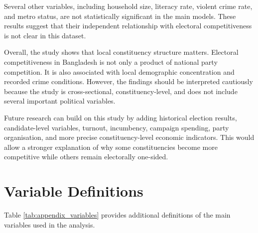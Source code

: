 \documentclass[12pt,a4paper]{article}
\begin{document}
Several other variables, including household size, literacy rate, violent crime rate, and metro status, are not statistically significant in the main models. These results suggest that their independent relationship with electoral competitiveness is not clear in this dataset.

Overall, the study shows that local constituency structure matters. Electoral competitiveness in Bangladesh is not only a product of national party competition. It is also associated with local demographic concentration and recorded crime conditions. However, the findings should be interpreted cautiously because the study is cross-sectional, constituency-level, and does not include several important political variables.

Future research can build on this study by adding historical election results, candidate-level variables, turnout, incumbency, campaign spending, party organisation, and more precise constituency-level economic indicators. This would allow a stronger explanation of why some constituencies become more competitive while others remain electorally one-sided.

\clearpage

\renewcommand{\refname}{References}



\clearpage
\appendix

\section{Variable Definitions}

Table \ref{tab:appendix_variables} provides additional definitions of the main variables used in the analysis.
\end{document}
